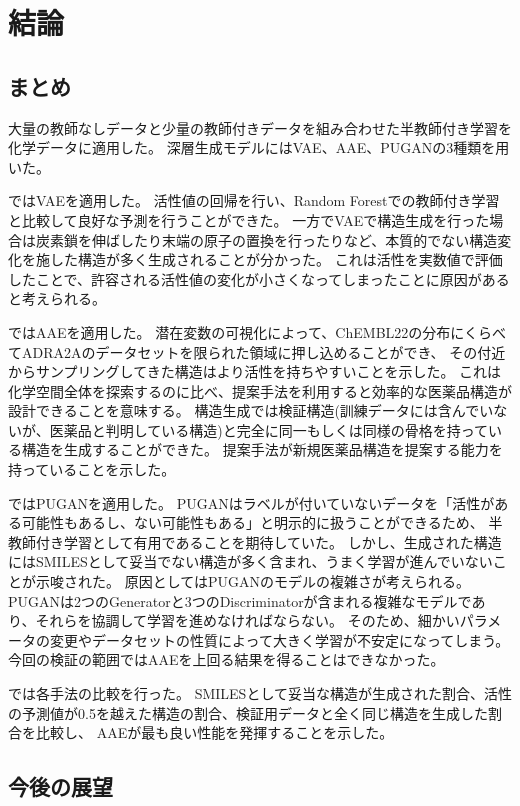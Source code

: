 \chapter{結論}

\section{まとめ}

大量の教師なしデータと少量の教師付きデータを組み合わせた半教師付き学習を化学データに適用した。
深層生成モデルにはVAE、AAE、PUGANの3種類を用いた。

ではVAEを適用した。
活性値の回帰を行い、Random Forestでの教師付き学習と比較して良好な予測を行うことができた。
一方でVAEで構造生成を行った場合は炭素鎖を伸ばしたり末端の原子の置換を行ったりなど、本質的でない構造変化を施した構造が多く生成されることが分かった。
これは活性を実数値で評価したことで、許容される活性値の変化が小さくなってしまったことに原因があると考えられる。

ではAAEを適用した。
潜在変数の可視化によって、ChEMBL22の分布にくらべてADRA2Aのデータセットを限られた領域に押し込めることができ、
その付近からサンプリングしてきた構造はより活性を持ちやすいことを示した。
これは化学空間全体を探索するのに比べ、提案手法を利用すると効率的な医薬品構造が設計できることを意味する。
構造生成では検証構造(訓練データには含んでいないが、医薬品と判明している構造)と完全に同一もしくは同様の骨格を持っている構造を生成することができた。
提案手法が新規医薬品構造を提案する能力を持っていることを示した。

ではPUGANを適用した。
PUGANはラベルが付いていないデータを「活性がある可能性もあるし、ない可能性もある」と明示的に扱うことができるため、
半教師付き学習として有用であることを期待していた。
しかし、生成された構造にはSMILESとして妥当でない構造が多く含まれ、うまく学習が進んでいないことが示唆された。
原因としてはPUGANのモデルの複雑さが考えられる。
PUGANは2つのGeneratorと3つのDiscriminatorが含まれる複雑なモデルであり、それらを協調して学習を進めなければならない。
そのため、細かいパラメータの変更やデータセットの性質によって大きく学習が不安定になってしまう。
今回の検証の範囲ではAAEを上回る結果を得ることはできなかった。

では各手法の比較を行った。
SMILESとして妥当な構造が生成された割合、活性の予測値が0.5を越えた構造の割合、検証用データと全く同じ構造を生成した割合を比較し、
AAEが最も良い性能を発揮することを示した。

\section{今後の展望}

